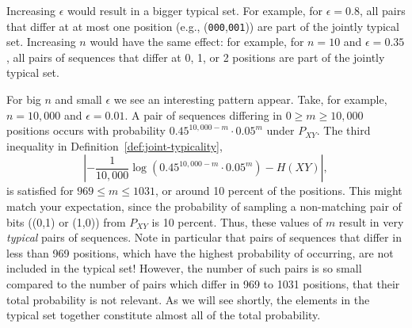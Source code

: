 \begin{example}
Increasing $\epsilon$ would result in a bigger typical set. For example, for $\epsilon = 0.8$, all pairs that differ at at most one position (e.g., (\texttt{000},\texttt{001})) are part of the jointly typical set. Increasing $n$ would have the same effect: for example, for $n = 10$ and $\epsilon = 0.35$, all pairs of sequences that differ at 0, 1, or 2 positions are part of the jointly typical set.

For big $n$ and small $\epsilon$ we see an interesting pattern appear. Take, for example, $n = 10,000$ and $\epsilon = 0.01$. A pair of sequences differing in $0 \geq m \geq 10,000$ positions occurs with probability $0.45^{10,000 - m} \cdot 0.05^m$ under $P_{XY}$. The third inequality in Definition~\ref{def:joint-typicality}, 
\[
\left| -\frac{1}{10,000} \log (0.45^{10,000 - m} \cdot 0.05^m) - H(XY)\right|,
\]
is satisfied for $969 \leq m \leq 1031$, or around 10 percent of the positions. This might match your expectation, since the probability of sampling a non-matching pair of bits ((0,1) or (1,0)) from $P_{XY}$ is 10 percent. Thus, these values of $m$ result in very \emph{typical} pairs of sequences. Note in particular that pairs of sequences that differ in less than 969 positions, which have the highest probability of occurring, are not included in the  typical set!  However, the number of such pairs is so small compared to the number of pairs which differ in 969 to 1031 positions, that their total probability is not relevant. As we will see shortly, the elements in the  typical set together constitute almost all of the total probability.
\end{example}

